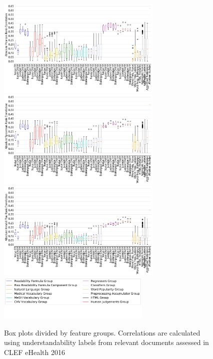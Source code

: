 \begin{figure}[th!]
   \centering
   \includegraphics[width=0.70\textwidth]{graphics/box_pearson16_raw_values}
   \includegraphics[width=0.70\textwidth]{graphics/box_spearman16_raw_values}
   \includegraphics[width=0.70\textwidth]{graphics/box_kendalltau16_raw_values}
    \includegraphics[width=0.65\textwidth]{graphics/legendCorr}
    \vspace{-1.cm}
    \caption{Box plots divided by feature groups. Correlations are calculated using understandability labels from relevant documents assessed in CLEF eHealth 2016}
   \label{fig:boxplot_corr_docs_2016}
\end{figure}

